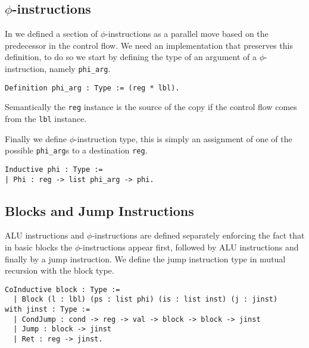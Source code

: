 \subsection{$\phi$-instructions}

In  we defined a section of $\phi$-instructions as a parallel move based on the predecessor in the control flow.
We need an implementation that preserves this definition, to do so we start by defining the type of an argument of a $\phi$-instruction, namely \texttt{phi\_arg}.

\begin{lstlisting}[style=Coq]
Definition phi_arg : Type := (reg * lbl).
\end{lstlisting}

Semantically the \texttt{reg} instance is the source of the copy if the control flow comes from the \texttt{lbl} instance.

Finally we define $\phi$-instruction type, this is simply an assignment of one of the possible \texttt{phi\_arg}s to a destination \texttt{reg}.

\begin{lstlisting}[style=Coq]
Inductive phi : Type :=
| Phi : reg -> list phi_arg -> phi.
\end{lstlisting}


\subsection{Blocks and Jump Instructions}

ALU instructions and $\phi$-instructions are defined separately enforcing the fact that in basic blocks the $\phi$-instructions appear first, followed by ALU instructions and finally by a jump instruction.
We define the jump instruction type in mutual recursion with the block type.

\begin{lstlisting}[style=Coq]
CoInductive block : Type :=
  | Block (l : lbl) (ps : list phi) (is : list inst) (j : jinst)
with jinst : Type :=
  | CondJump : cond -> reg -> val -> block -> block -> jinst
  | Jump : block -> jinst
  | Ret : reg -> jinst.
\end{lstlisting}

